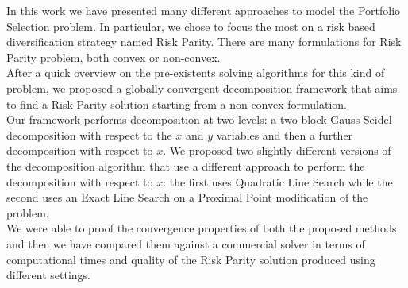 In this work we have presented many different approaches to model the Portfolio Selection problem. In particular, we chose to focus the most on a risk based diversification strategy named Risk Parity. There are many formulations for Risk Parity problem, both convex or non-convex.\\ After a quick overview on the pre-existents solving algorithms for this kind of problem, we proposed a globally convergent decomposition framework that aims to find a Risk Parity solution starting from a non-convex formulation.\\ Our framework performs decomposition at two levels: a two-block Gauss-Seidel decomposition with respect to the $x$ and $y$ variables and then a further decomposition with respect to $x$. We proposed two slightly different versions of the decomposition algorithm that use a different approach to perform the decomposition with respect to $x$: the first uses Quadratic Line Search while the second uses an Exact Line Search on a Proximal Point modification of the problem.\\ We were able to proof the convergence properties of both the proposed methods and then we have compared them against a commercial solver in terms of computational times and quality of the Risk Parity solution produced using different settings. 